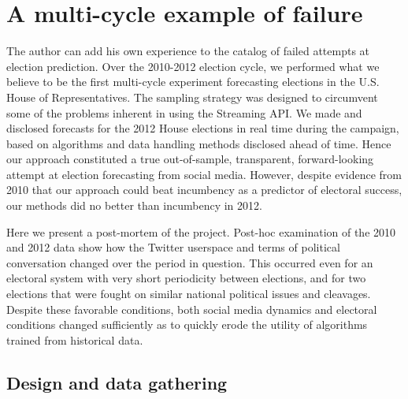 \documentclass{article}
\begin{document}
\section{A multi-cycle example of failure}
\label{sec:multi-cycle-example}


The author can add his own experience to the catalog of failed
attempts at election prediction. Over the 2010-2012 election cycle, we
performed what we believe to be the first multi-cycle experiment
forecasting elections in the U.S. House of Representatives. The
sampling strategy was designed to circumvent some of the problems
inherent in using the Streaming API. We made and disclosed forecasts
for the 2012 House elections in real time during the campaign, based
on algorithms and data handling methods disclosed ahead of time. Hence
our approach constituted a true out-of-sample, transparent, forward-looking attempt
at election forecasting from social media. However, despite evidence
from 2010 that our approach could beat incumbency as a predictor of
electoral success, our methods did no better than incumbency in 2012.

Here we present a post-mortem of the project. Post-hoc examination of
the 2010 and 2012 data show how the Twitter userspace and terms of
political conversation changed over the period in question. This
occurred even for an electoral system with very short periodicity
between elections, and for two elections that were fought on similar
national political issues and cleavages. Despite these favorable
conditions, both social media dynamics and electoral conditions
changed sufficiently as to quickly erode the utility of algorithms
trained from historical data. 

\subsection{Design and data gathering}
\label{sec:design-data-gath}
\end{document}
